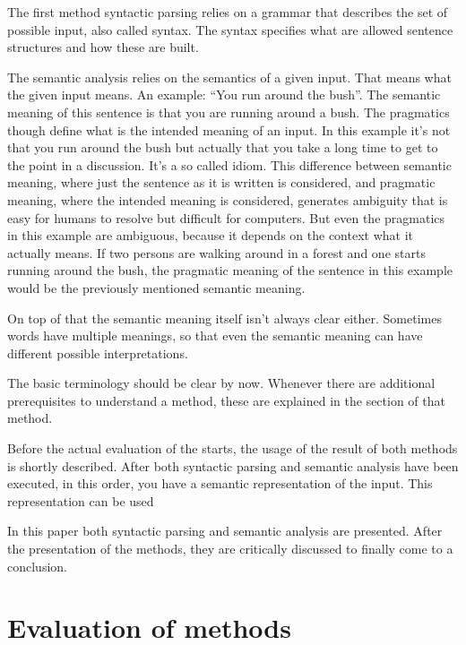 \documentclass[12pt,twoside]{scrartcl}
\theoremstyle{plain}
\theoremstyle{definition}
\theoremstyle{remark}
\begin{document}
	The first method syntactic parsing relies on a grammar that describes the set of possible input, also called syntax. The syntax specifies what are allowed sentence structures and how these are built.
	
	The semantic analysis relies on the semantics of a given input. That means what the given input means. An example: ``You run around the bush''. The semantic meaning of this sentence is that you are running around a bush. 
	The pragmatics though define what is the intended meaning of an input. In this example it's not that you run around the bush but actually that you take a long time to get to the point in a discussion. It's a so called idiom. This difference between semantic meaning, where just the sentence as it is written is considered, and pragmatic meaning, where the intended meaning is considered, generates ambiguity that is easy for humans to resolve but difficult for computers. But even the pragmatics in this example are ambiguous, because it depends on the context what it actually means. If two persons are walking around in a forest and one starts running around the bush, the pragmatic meaning of the sentence in this example would be the previously mentioned semantic meaning.
	
	On top of that the semantic meaning itself isn't always clear either. Sometimes words have multiple meanings, so that even the semantic meaning can have different possible interpretations.
	
	The basic terminology should be clear by now. Whenever there are additional prerequisites to understand a method, these are explained in the section of that method.
	
	Before the actual evaluation of the starts, the usage of the result of both methods is shortly described. After both syntactic parsing and semantic analysis have been executed, in this order, you have a semantic representation of the input. This representation can be used  %
	
	In this paper both syntactic parsing and semantic analysis are presented. After the presentation of the methods, they are critically discussed to finally come to a conclusion.

\section{Evaluation of methods}
\label{sec:evalMethods}
	
	
\end{document}
